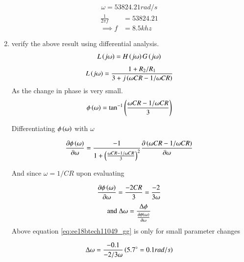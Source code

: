 \begin{enumerate}[label=\arabic*.,ref=\theenumi]
\begin{align}
    \omega = 53824.21 rad/s
\end{align}
\begin{align}
    \frac{1}{2\pi f} &= 53824.21 \\
    \implies f &= 8.5 khz 
\end{align}

\item verify the above result using differential analysis.\\
\solution 
\begin{align}
    L\left(j\omega\right) = H\left(j\omega\right)G\left(j\omega\right)
\end{align}
%
\begin{align}
\label{eq:ee18btech11049_wein_main}
    L\brak{j\omega} = \frac{1+ R_2/R_1 }  {3+j\brak{\omega CR - 1/\omega CR}}
\end{align}
%
As the change in phase is very small. 
\begin{align}
    \phi\left(\omega\right) = \tan^{-1}\left(\frac{\omega CR - 1/\omega CR}{3}\right)
\end{align}

%
Differentiating $\phi\left(\omega\right) $ with $\omega$

%
\begin{align}
\label{eq:ee18btech11049_freq}
    \frac{\partial \phi\brak{\omega}}{\partial \omega}
    =\frac{-1}{1+\brak{\frac{\omega CR - 1/\omega CR}{3}}^2}
    \frac{\partial \brak{\omega CR - 1/\omega CR }}{\partial \omega}
\end{align}

%
And since $\omega = 1/CR$ upon evaluating  

%
\begin{align}
\label{eq:ee18btech11049_freq}
    \frac{\partial \phi\brak{\omega}}{\partial \omega}
   = \frac{-2CR}{3} = \frac{-2}{3\omega}
\end{align}
%
\begin{align}
\label{eq:ee18btech11049_gg}
    \text{and } \Delta\omega = \frac{\Delta\phi}{ \frac{\partial \phi\brak{\omega}}{\partial \omega}}
\end{align}
Above equation \ref{eq:ee18btech11049_gg}  is only for small parameter changes

\begin{align}
\label{eq:ee18btech11049_freq}
    \Delta\omega = \frac{-0.1}{ -2/3\omega} \brak{ 5.7\degree = 0.1 rad/s }
\end{align}


\end{enumerate}
